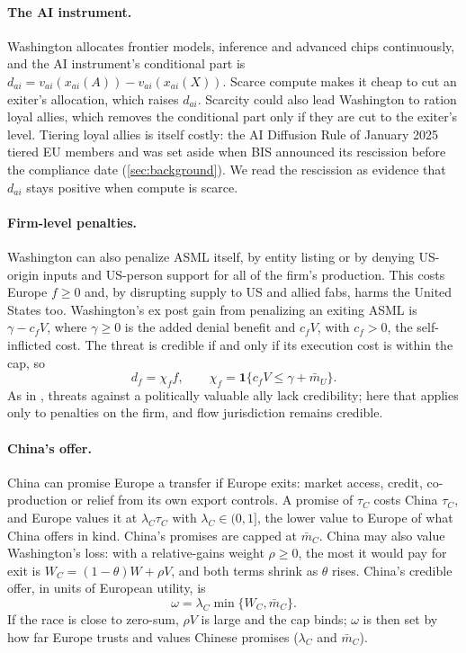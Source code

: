 \paragraph{The AI instrument.} Washington allocates frontier models, inference and advanced chips continuously, and the AI instrument's conditional part is $d_{ai}=v_{ai}(x_{ai}(A))-v_{ai}(x_{ai}(X))$. Scarce compute makes it cheap to cut an exiter's allocation, which raises $d_{ai}$. Scarcity could also lead Washington to ration loyal allies, which removes the conditional part only if they are cut to the exiter's level. Tiering loyal allies is itself costly: the AI Diffusion Rule of January 2025 tiered EU members and was set aside when BIS announced its rescission before the compliance date (\cref{sec:background}). We read the rescission as evidence that $d_{ai}$ stays positive when compute is scarce.

\paragraph{Firm-level penalties.} Washington can also penalize ASML itself, by entity listing or by denying US-origin inputs and US-person support for all of the firm's production. This costs Europe $f\ge 0$ and, by disrupting supply to US and allied fabs, harms the United States too. Washington's ex post gain from penalizing an exiting ASML is $\gamma-c_f V$, where $\gamma\ge 0$ is the added denial benefit and $c_f V$, with $c_f>0$, the self-inflicted cost. The threat is credible if and only if its execution cost is within the cap, so
\[
d_f=\chi_f f,\qquad \chi_f=\mathbf 1\{c_f V\le\gamma+\bar m_U\}.
\]
As in \citet{wolford2017alliances}, threats against a politically valuable ally lack credibility; here that applies only to penalties on the firm, and flow jurisdiction remains credible.

\paragraph{China's offer.} China can promise Europe a transfer if Europe exits: market access, credit, co-production or relief from its own export controls. A promise of $\tau_C$ costs China $\tau_C$, and Europe values it at $\lambda_C\tau_C$ with $\lambda_C\in(0,1]$, the lower value to Europe of what China offers in kind. China's promises are capped at $\bar m_C$. China may also value Washington's loss: with a relative-gains weight $\rho\ge 0$, the most it would pay for exit is $W_C=(1-\theta)W+\rho V$, and both terms shrink as $\theta$ rises. China's credible offer, in units of European utility, is
\begin{equation}\label{eq:omega}
\omega=\lambda_C\min\{W_C,\bar m_C\}.
\end{equation}
If the race is close to zero-sum, $\rho V$ is large and the cap binds; $\omega$ is then set by how far Europe trusts and values Chinese promises ($\lambda_C$ and $\bar m_C$).

